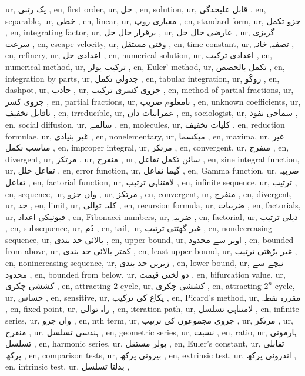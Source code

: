 ur, یک رتبی ,
en, first order,
ur, حل ,
en, solution,
ur, قابل علیحدگی ,
en, separable,
ur, خطی ,
en, linear,
ur, معیاری روپ ,
en, standard form,
ur, جزو تکمل ,
en, integrating factor,
ur, برقرار حال حل ,
ur, عارضی حال حل ,
ur, گریزی سرعت ,
en, escape velocity,
ur, وقتی مستقل ,
en, time constant,
ur, تصفیہ خانہ  ,
en, refinery,
ur, اعدادی حل ,
en, numerical solution,
ur, اعدادی ترکیب ,
en, numerical method,
ur, ترکیب یولر ,
en, Euler' method,
ur, تکمل بالحصص ,
en, integration by parts,
ur, جدولی تکمل ,
en, tabular integration,
ur, روکُو ,
en, dashpot,
ur, جاذب ,
ur, جزوی کسری ترکیب ,
en, method of partial fractions,
ur, جزوی کسر ,
en, partial fractions,
ur, نامعلوم ضریب  ,
en, unknown coefficients,
ur, ناقابل تخفیف ,
en, irreducible,
ur, عمرانیات دان  ,
en, sociologist,
ur, سماجی نفوذ ,
en, social diffusion,
ur, سالمے ,
en, molecules,
ur, کلیات تخفیف ,
en, reduction formulae,
ur, غیر بنیادی ,
en, nonelementary,
ur, میکسما ,
en, maxima,
ur, غیر مناسب تکمل ,
en, improper integral,
ur, مرتکز ,
en, convergent,
ur, منفرج ,
en, divergent,
ur, مرتکز ,
ur, منفرج ,
ur, سائن تکمل تفاعل ,
en, sine integral function,
ur, تفاعل خلل ,
en, error function,
ur, گیما تفاعل ,
en, Gamma function,
ur, ضربیہ تفاعل ,
en, factorial function,
ur, لامتناہی ترتیب ,
en, infinite sequence,
ur, ترتیب ,
en, sequence,
ur,  واں جزو ,
ur, مرتکز ,
en, convergent,
ur, منفرج ,
en, divergent,
ur, حد ,
en, limit,
ur, کلیہ توالی ,
en, recursion formula,
ur, ضربیات ,
en, factorials,
ur, فبونیکی اعداد ,
en, Fibonacci numbers,
ur, ضربیہ ,
en, factorial,
ur, ذیلی ترتیب ,
en, subsequence,
ur, دُم ,
en, tail,
ur, غیر گھٹتی ترتیب ,
en, nondecreasing sequence,
ur, بالائی حد بندی ,
en, upper bound,
ur, اوپر سے محدود ,
en, bounded from above,
ur, کمتر بالائی حد بندی ,
en, least upper bound,
ur, غیر بڑھتی ترتیب ,
en, nonincreasing sequence,
ur, زیریں حد بندی ,
en, lower bound,
ur, نیچے سے محدود ,
en, bounded from below,
ur, دو لختی قیمت ,
en, bifurcation value,
ur, کششی  چکری ,
en, attracting $2$-cycle,
ur, کششی  چکری ,
en, attracting $2^n$-cycle,
ur, حساس ,
en, sensitive,
ur, پکاغ کی ترکیب ,
en, Picard's method,
ur, مقررہ نقطہ ,
en, fixed point,
ur, راہ توالی ,
en, iteration path,
ur, لامتناہی تسلسل ,
en, infinite series,
ur,  واں جزو ,
en, nth term,
ur, جزوی مجموعوں کی ترتیب ,
ur, مرتکز ,
ur, منفرج ,
ur, ہندسی تسلسل ,
en, geometric series,
ur, نسبت  ,
en, ratio,
ur, ہارمونی تسلسل ,
en, harmonic series,
ur, یولر مستقل ,
en, Euler's constant,
ur, تقابلی پرکھ ,
en, comparison tests,
ur, بیرونی پرکھ ,
en, extrinsic test,
ur, اندرونی پرکھ ,
en, intrinsic test,
ur, بدلتا تسلسل ,
